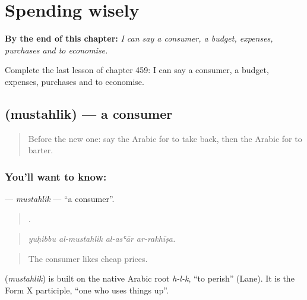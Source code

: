 
\chapter{Spending wisely}
\label{ch:ar-spending-wisely}

\begin{chapteropening}
\textbf{By the end of this chapter:} \emph{I can say a consumer, a budget, expenses, purchases and to economise.}

Complete the last lesson of chapter 459: I can say a consumer, a budget, expenses, purchases and to economise.
\end{chapteropening}

\section[\texorpdfstring{\ar{مستهلك} (mustahlik)}{مستهلك (mustahlik)}]{ (mustahlik) — a consumer}

\label{lesson:AR-C459-mustahlik}



\begin{quote}
Before the new one: say the Arabic for to take back, then the Arabic for to barter.
\end{quote}

\subsection*{You'll want to know: }
\textbf{} — \emph{mustahlik} — \textquotedblleft{}a consumer\textquotedblright{}.

\begin{quote}
   .
\end{quote}

\begin{quote}
\emph{yuḥibbu al-mustahlik al-asʿār ar-rakhīṣa.}
\end{quote}

\begin{quote}
The consumer likes cheap prices.
\end{quote}

\begin{cousinweb}
\textbf{} (\emph{mustahlik}) is built on the native Arabic root \emph{h-l-k}, \textquotedblleft{}to perish\textquotedblright{} (Lane). It is the Form X participle, \textquotedblleft{}one who uses things up\textquotedblright{}.
\end{cousinweb}

